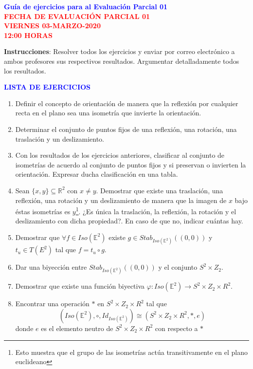 \documentclass[12pt]{report}
\numberwithin{section}{chapter}
\newcommand{\E}{\mathbb E}
\begin{document}
\begin{center}
\textcolor{blue}{\textbf{\large Guía de ejercicios para al Evaluación Parcial 01}}\\
\vspace{0.5 cm}
\textcolor{red}{\textbf{\large FECHA DE EVALUACIÓN PARCIAL 01 \\ VIERNES 03-MARZO-2020\\ 12:00 HORAS}}
\end{center}

\textbf{Instrucciones}: Resolver todos los ejercicios y enviar por correo electrónico a ambos profesores sus respectivos resultados. Argumentar detalladamente todos los resultados.

\vspace{1cm}


\begin{center}
\textcolor{blue}{\textbf{\large LISTA DE EJERCICIOS}}
\end{center}


\begin{enumerate}
\item Definir el concepto de orientación de manera que la reflexión por cualquier recta en el plano sea una isometría que invierte la orientación.

\item Determinar el conjunto de puntos fijos de una reflexión, una rotación, una traslación y un deslizamiento.

\item Con los resultados de los ejercicios anteriores, clasificar al conjunto de isometrías de acuerdo al conjunto de puntos fijos y si preservan o invierten la orientación. Expresar ducha clasificación en una tabla.

\item Sean $\{x, y\}\subseteq \mathbb{R}^2$ con $x \neq y$. Demostrar que existe una traslación, una reflexión, una rotación y un deslizamiento de manera que la imagen de $x$ bajo éstas isometrías es $y$\footnote{Esto muestra que el grupo de las isometrías actúa transitivamente en el plano euclideano}. ¿Es única la traslación, la reflexión, la rotación y el deslizamiento con dicha propiedad?. En caso de que no, indicar cuántas hay.

\item Demostrar que $\forall f\in Iso(\E^2)$ existe $g \in Stab_{Iso(\E^2)}((0,0))$ y $t_u \in T(E^2)$ tal que $f= t_u \circ g$.

\item Dar una biyección entre $Stab_{Iso(\E^2)}((0,0))$ y el conjunto $S^2 \times Z_2$.

\item Demostrar que existe una función biyectiva $\varphi: Iso(\E^2) \to S^2 \times Z_2 \times R^2$.

\item Encontrar una operación $*$ en $S^2 \times Z_2 \times R^2$ tal que 
$$(Iso(\E^2), \circ, Id_{Iso(\E^2)}) \cong( S^2 \times Z_2 \times R^2, *, e)$$
donde $e$ es el elemento neutro de $S^2 \times Z_2 \times R^2$ con respecto a $*$


\end{enumerate}
\end{document}
